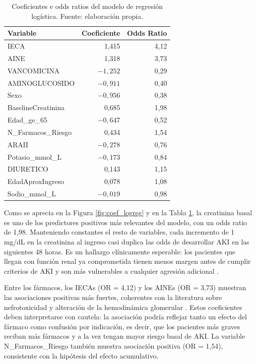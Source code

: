 \documentclass[12pt, a4paper, oneside]{report}
\begin{document}
\begin{table}[h]
    \centering
    \begin{tabular}{lrr}
        \toprule
        \textbf{Variable} & \textbf{Coeficiente} & \textbf{Odds Ratio} \\
        \midrule
        IECA                & 1,415  & 4,12 \\
        AINE                & 1,318  & 3,73 \\
        VANCOMICINA         & $-1,252$ & 0,29 \\
        AMINOGLUCOSIDO      & $-0,911$ & 0,40 \\
        Sexo                & $-0,956$ & 0,38 \\
        BaselineCreatinina  & 0,685  & 1,98 \\
        Edad\_ge\_65        & $-0,647$ & 0,52 \\
        N\_Farmacos\_Riesgo & 0,434  & 1,54 \\
        ARAII               & $-0,278$ & 0,76 \\
        Potasio\_mmol\_L    & $-0,173$ & 0,84 \\
        DIURETICO           & 0,143  & 1,15 \\
        EdadAproxIngreso    & 0,078  & 1,08 \\
        Sodio\_mmol\_L      & $-0,019$ & 0,98 \\
        \bottomrule
    \end{tabular}
    \caption{Coeficientes e odds ratios del modelo de regresión logística. Fuente: elaboración propia.}
    \label{tab:coef_lr}
\end{table}

Como se aprecia en la Figura \ref{fig:coef_logreg} y en la Tabla \ref{tab:coef_lr}, la creatinina basal es uno de los predictores positivos más relevantes del modelo, con un odds ratio de 1,98. Manteniendo constantes el resto de variables, cada incremento de 1 mg/dL en la creatinina al ingreso casi duplica las odds de desarrollar AKI en las siguientes 48 horas. Es un hallazgo clínicamente esperable: los pacientes que llegan con función renal ya comprometida tienen menos margen antes de cumplir criterios de AKI y son más vulnerables a cualquier agresión adicional \parencite{chawla2014akickd, kellum2021acute}.

Entre los fármacos, los IECAs (OR = 4,12) y los AINEs (OR = 3,73) muestran las asociaciones positivas más fuertes, coherentes con la literatura sobre nefrotoxicidad y alteración de la hemodinámica glomerular \parencite{perazella2019drug, zhang2017nsaid}. Estos coeficientes deben interpretarse con cautela: la asociación podría reflejar tanto un efecto del fármaco como confusión por indicación, es decir, que los pacientes más graves reciban más fármacos y a la vez tengan mayor riesgo basal de AKI. La variable N\_Farmacos\_Riesgo también muestra asociación positiva (OR = 1,54), consistente con la hipótesis del efecto acumulativo.
\end{document}
